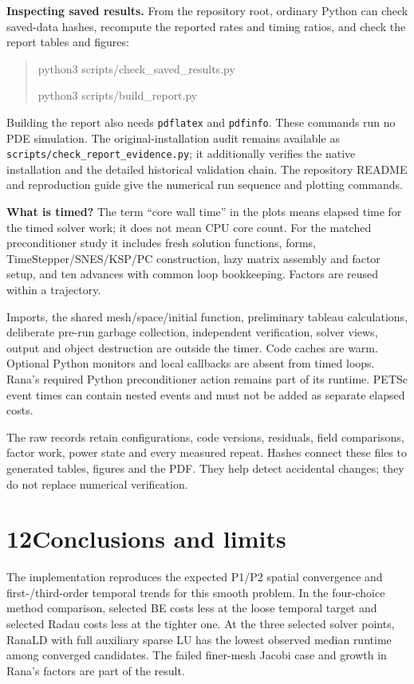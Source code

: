 \documentclass[11pt,a4paper]{article}
\newcommand{\code}[1]{\texttt{#1}}
\begin{document}
\textbf{Inspecting saved results.} From the repository root, ordinary Python can check saved-data hashes, recompute the reported rates and timing ratios, and check the report tables and figures:
\begin{quote}\small\ttfamily
python3 scripts/check\_saved\_results.py\par
python3 scripts/build\_report.py
\end{quote}
Building the report also needs \code{pdflatex} and \code{pdfinfo}. These commands run no PDE simulation. The original-installation audit remains available as \code{scripts/check\_report\_evidence.py}; it additionally verifies the native installation and the detailed historical validation chain. The repository README and reproduction guide give the numerical run sequence and plotting commands.

\textbf{What is timed?} The term ``core wall time'' in the plots means elapsed time for the timed solver work; it does not mean CPU core count. For the matched preconditioner study it includes fresh solution functions, forms, TimeStepper/SNES/KSP/PC construction, lazy matrix assembly and factor setup, and ten advances with common loop bookkeeping. Factors are reused within a trajectory.

Imports, the shared mesh/space/initial function, preliminary tableau calculations, deliberate pre-run garbage collection, independent verification, solver views, output and object destruction are outside the timer. Code caches are warm. Optional Python monitors and local callbacks are absent from timed loops. Rana's required Python preconditioner action remains part of its runtime. PETSc event times can contain nested events and must not be added as separate elapsed costs.

The raw records retain configurations, code versions, residuals, field comparisons, factor work, power state and every measured repeat. Hashes connect these files to generated tables, figures and the PDF. They help detect accidental changes; they do not replace numerical verification.

\newpage
\section*{12\quad Conclusions and limits}
The implementation reproduces the expected P1/P2 spatial convergence and first-/third-order temporal trends for this smooth problem. In the four-choice method comparison, selected BE costs less at the loose temporal target and selected Radau costs less at the tighter one. At the three selected solver points, RanaLD with full auxiliary sparse LU has the lowest observed median runtime among converged candidates. The failed finer-mesh Jacobi case and growth in Rana's factors are part of the result.
\end{document}
